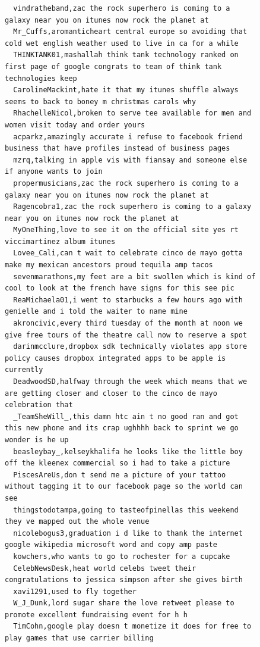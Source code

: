 \begin{figure}[htpb]
\begin{verbatim}
  vindratheband,zac the rock superhero is coming to a galaxy near you on itunes now rock the planet at
  Mr_Cuffs,aromanticheart central europe so avoiding that cold wet english weather used to live in ca for a while
  THINKTANK01,mashallah think tank technology ranked on first page of google congrats to team of think tank technologies keep
  CarolineMackint,hate it that my itunes shuffle always seems to back to boney m christmas carols why
  RhachelleNicol,broken to serve tee available for men and women visit today and order yours
  acparkz,amazingly accurate i refuse to facebook friend business that have profiles instead of business pages
  mzrq,talking in apple vis with fiansay and someone else if anyone wants to join
  propermusicians,zac the rock superhero is coming to a galaxy near you on itunes now rock the planet at
  Ragencobra1,zac the rock superhero is coming to a galaxy near you on itunes now rock the planet at
  MyOneThing,love to see it on the official site yes rt viccimartinez album itunes
  Lovee_Cali,can t wait to celebrate cinco de mayo gotta make my mexican ancestors proud tequila amp tacos
  sevenmarathons,my feet are a bit swollen which is kind of cool to look at the french have signs for this see pic
  ReaMichaela01,i went to starbucks a few hours ago with genielle and i told the waiter to name mine
  akroncivic,every third tuesday of the month at noon we give free tours of the theatre call now to reserve a spot
  darinmcclure,dropbox sdk technically violates app store policy causes dropbox integrated apps to be apple is currently
  DeadwoodSD,halfway through the week which means that we are getting closer and closer to the cinco de mayo celebration that
  _TeamSheWill_,this damn htc ain t no good ran and got this new phone and its crap ughhhh back to sprint we go wonder is he up
  beasleybay_,kelseykhalifa he looks like the little boy off the kleenex commercial so i had to take a picture
  PiscesAreUs,don t send me a picture of your tattoo without tagging it to our facebook page so the world can see
  thingstodotampa,going to tasteofpinellas this weekend they ve mapped out the whole venue
  nicolebogus3,graduation i d like to thank the internet google wikipedia microsoft word and copy amp paste
  kowchers,who wants to go to rochester for a cupcake
  CelebNewsDesk,heat world celebs tweet their congratulations to jessica simpson after she gives birth
  xavi1291,used to fly together
  W_J_Dunk,lord sugar share the love retweet please to promote excellent fundraising event for h h
  TimCohn,google play doesn t monetize it does for free to play games that use carrier billing

\end{verbatim}
\end{figure}
